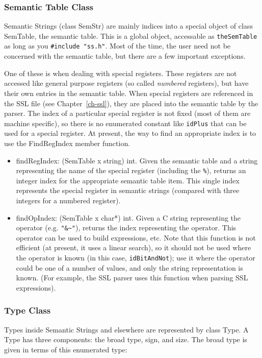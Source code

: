 \subsubsection{Semantic Table Class}
\label{sec-semtable}

Semantic Strings (class SemStr) are mainly indices into a special
object of class SemTable, the semantic table. This is a global
object, accessable as {\tt theSemTable} as long as you
{\tt \#include "ss.h"}. Most of the time, the user need not be
concerned with the semantic table, but there are a few important
exceptions.

One of these is when dealing with special registers. These registers
are not accessed like general purpose registers (so called {\it numbered}
registers), but have their own entries in the semantic table. When
special registers are referenced in the SSL file (see Chapter~\ref{ch-ssl}),
they are placed into
the semantic table by the parser. The index of a particular special
register is not fixed (most of them are machine specific), so there is no
enumerated constant like {\tt idPlus} that can be used for a special
register. At present, the way to find an appropriate index is to use
the FindRegIndex member function.

\begin{itemize}
\item   findRegIndex: (SemTable x string) \ra int.
    Given the semantic table and a string representing the name of the
    special register (including the {\tt \%}), returns an integer index
    for the appropriate semantic table item. This single index
    represents the special register in semantic strings (compared with
    three integers for a numbered register).

\item   findOpIndex: (SemTable x char*) \ra int.
    Given a C string representing the operator (e.g. {\tt \verb!"&~"!}),
    returns the index representing the operator. This operator can be
    used to build expressions, etc. Note that this function is not
    efficient (at present, it uses a linear search), so it should not
    be used where the operator is known (in this case, {\tt idBitAndNot});
    use it where the operator could be one of a number of values, and
    only the string representation is known. (For example, the SSL
    parser uses this function when parsing SSL expressions).

\end{itemize}

\subsubsection{Type Class}
\label{sec-class-type}
Types inside Semantic Strings and elsewhere are represented by class Type.
A Type has three components: the broad type, sign, and size. The broad type
is given in terms of this enumerated type:

